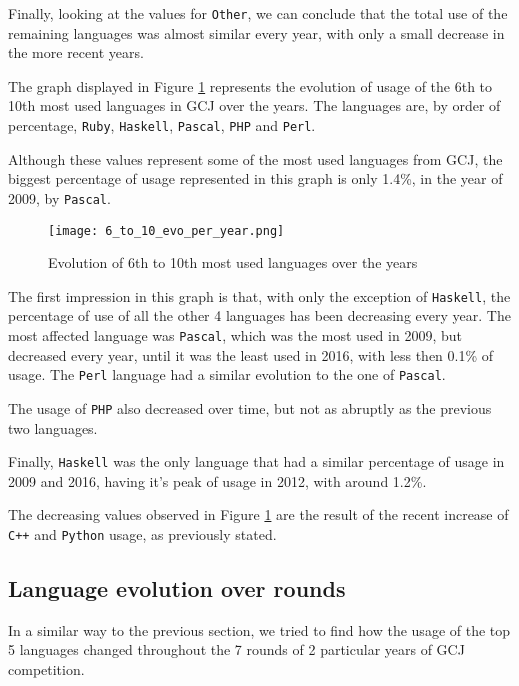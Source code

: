 \documentclass{article}
\begin{document}
\begin{multicols*}{2}
Finally, looking at the values for \texttt{Other}, we can conclude that the total use of the remaining languages was almost similar every year, with only a small decrease in the more recent years.


The graph displayed in Figure \ref{fig:6_to_10_evo} represents the evolution of usage of the 6th to 10th most used languages in GCJ over the years. The languages are, by order of percentage, \texttt{Ruby}, \texttt{Haskell}, \texttt{Pascal}, \texttt{PHP} and \texttt{Perl}.

Although these values represent some of the most used languages from GCJ, the biggest percentage of usage represented in this graph is only 1.4\%, in the year of 2009, by \texttt{Pascal}.


\begin{figure}[H]
    \centering
    \texttt{[image: 6\_to\_10\_evo\_per\_year.png]}
    \caption{Evolution of 6th to 10th most used languages over the years}
    \label{fig:6_to_10_evo}
\end{figure}

The first impression in this graph is that, with only the exception of \texttt{Haskell}, the percentage of use of all the other 4 languages has been decreasing every year. The most affected language was \texttt{Pascal}, which was the most used in 2009, but decreased every year, until it was the least used in 2016, with less then 0.1\% of usage. The \texttt{Perl} language had a similar evolution to the one of \texttt{Pascal}.

The usage of \texttt{PHP} also decreased over time, but not as abruptly as the previous two languages.

Finally, \texttt{Haskell} was the only language that had a similar percentage of usage in 2009 and 2016, having it's peak of usage in 2012, with around 1.2\%.

The decreasing values observed in Figure \ref{fig:6_to_10_evo} are the result of the recent increase of \texttt{C++} and \texttt{Python} usage, as previously stated.




\subsection{Language evolution over rounds}

In a similar way to the previous section, we tried to find how the usage of the top 5 languages changed throughout the 7 rounds of 2 particular years of GCJ competition.


\end{multicols*}
\end{document}

